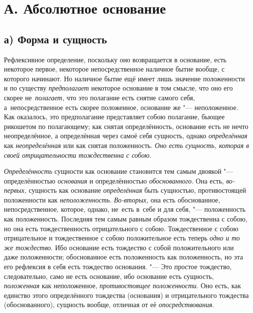 \section[А. Абсолютное основание]{А. Абсолютное основание}

\subsection[а) Форма и сущность]{а) Форма и сущность}

Рефлексивное определение, поскольку оно возвращается в основание, есть
некоторое первое, некоторое непосредственное наличное бытие вообще, с которого
начинают. Но наличное бытие ещё имеет лишь значение положенности и по существу
{\em предполагает} некоторое основание в том смысле, что оно его скорее
не~{\em полагает,} что это полагание есть снятие самого себя,
а~непосредственное есть скорее положенное, основание же "--- неположенное. Как
оказалось, это предполагание представляет собою полагание, бьющее рикошетом по
полагающему; как снятая определённость, основание есть не нечто неопределённое,
а определённая через самоё себя сущность, однако {\em определённая}
как {\em неопределённая} или как снятая положенность.
{\em Оно есть сущность, которая в своей отрицательности тождественна с собою}.

{\em Определённость} сущности как основание становится тем самым двоякой "---
определённостью {\em основания} и определённостью {\em обоснованного}. Она
есть, {\em во-первых,} сущность как основание {\em определённая} быть
сущностью, противостоящей положенности как {\em неположенность}.
{\em Во-вторых,} она есть обоснованное, непосредственное, которое, однако,
не~есть в~себе и для себя, "--- положенность как положенность. Последняя тем
самым равным образом тождественна с собою, но она есть тождественность
отрицательного с собою. Тождественное с собою отрицательное и тождественное с
собою положительное есть теперь {\em одно и то же тождество}. Ибо основание
есть тождество с собой положительного или даже положенности; обоснованное есть
положенность как положенность, но эта его рефлексия в себя есть тождество
основания. "--- Это простое тождество, следовательно, само не есть основание,
ибо основание есть сущность, {\em положенная} как неположенное,
{\em противостоящее положенности}. Оно есть, как единство этого определённого
тождества (основания) и отрицательного тождества (обоснованного), сущность
вообще, отличная от её {\em опосредствования}.

